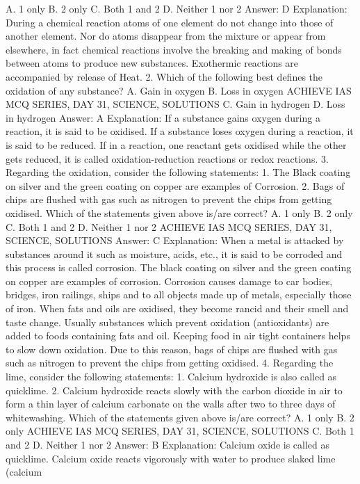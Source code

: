 A. 1 only
B. 2 only
C. Both 1 and 2
D. Neither 1 nor 2
Answer: D
Explanation: During a chemical reaction atoms of one element do not
change into those of another element. Nor do atoms disappear from
the mixture or appear from elsewhere, in fact chemical reactions
involve the breaking and making of bonds between atoms to produce
new substances. Exothermic reactions are accompanied by release
of Heat.
2. Which of the following best defines the oxidation of any
substance?
A. Gain in oxygen
B. Loss in oxygen
ACHIEVE IAS MCQ SERIES, DAY 31, SCIENCE, SOLUTIONS
C. Gain in hydrogen
D. Loss in hydrogen
Answer: A
Explanation: If a substance gains oxygen during a reaction, it is said
to be oxidised. If a substance loses oxygen during a reaction, it is
said to be reduced.
If in a reaction, one reactant gets oxidised while the other gets
reduced, it is called oxidation-reduction reactions or redox
reactions.
3. Regarding the oxidation, consider the following statements:
1. The Black coating on silver and the green coating on copper are
examples of Corrosion.
2. Bags of chips are flushed with gas such as nitrogen to prevent the
chips from getting oxidised.
Which of the statements given above is/are correct?
A. 1 only
B. 2 only
C. Both 1 and 2
D. Neither 1 nor 2
ACHIEVE IAS MCQ SERIES, DAY 31, SCIENCE, SOLUTIONS
Answer: C
Explanation:
When a metal is attacked by substances around it such as moisture,
acids, etc., it is said to be corroded and this process is called
corrosion. The black coating on silver and the green coating on
copper are examples of corrosion. Corrosion causes damage to car
bodies, bridges, iron railings, ships and to all objects made up of
metals, especially those of iron.
When fats and oils are oxidised, they become rancid and their smell
and taste change. Usually substances which prevent oxidation
(antioxidants) are added to foods containing fats and oil. Keeping
food in air tight containers helps to slow down oxidation. Due to this
reason, bags of chips are flushed with gas such as nitrogen to
prevent the chips from getting oxidised.
4. Regarding the lime, consider the following statements:
1. Calcium hydroxide is also called as quicklime.
2. Calcium hydroxide reacts slowly with the carbon dioxide in air to
form a thin layer of calcium carbonate on the walls after two to
three days of whitewashing.
Which of the statements given above is/are correct?
A. 1 only
B. 2 only
ACHIEVE IAS MCQ SERIES, DAY 31, SCIENCE, SOLUTIONS
C. Both 1 and 2
D. Neither 1 nor 2
Answer: B
Explanation: Calcium oxide is called as quicklime. Calcium oxide
reacts vigorously with water to produce slaked lime (calcium
